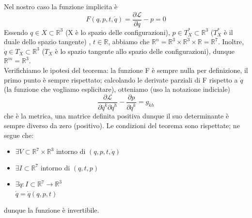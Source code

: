 \documentclass[
10pt, %
a4paper, %
oneside, %
headinclude,footinclude, %
BCOR5mm, %
]{scrartcl}
\begin{document}
\begin{dimostrazione}
Nel nostro caso la funzione implicita è
\[F(q, p, t, \dot{q}) = \frac{\partial \mathcal{L}}{\partial \dot{q}}-p=0\]
Essendo \(q\in X\subset\mathbb{R}^3\) (X è lo spazio delle configurazioni), \(p\in T^*_X\subset\mathbb{R}^3 \) (\( T^*_X\) è il duale dello spazio tangente) , \(t\in \mathbb{R}\), abbiamo che \(\mathbb{R}^n = \mathbb{R}^3\times\mathbb{R}^3\times \mathbb{R} = \mathbb{R}^7\). Inoltre, \(\dot{q}\in T_X\subset\mathbb{R}^3\) (\(T_X\) è lo spazio tangente allo spazio delle configurazioni), dunque \(\mathbb{R}^m = \mathbb{R}^3\).\\
Verifichiamo le ipotesi del teorema: la funzione F è sempre nulla per definizione, il primo punto è sempre rispettato; calcolando le derivate parziali di F rispetto a $\dot{q}$ (la funzione che vogliamo esplicitare), otteniamo (uso la notazione indiciale)
\[\frac{\partial \mathcal{L}}{\partial \dot{q}^k\partial \dot{q}^h}- \frac{\partial p}{\partial \dot{q}^k} = g_{kh}\]
che è la metrica, una matrice definita positiva dunque il suo determinante è sempre diverso da zero (positivo). Le condizioni del teorema sono rispettate; ne segue che:
\begin{itemize}
	\item
	\(\exists V \subset \mathbb{R}^7\times \mathbb{R}^3\)
	intorno di \((q, p, t, \dot{q})\)
	\item  \(\exists I \subset \mathbb{R}^7\)
	intorno di \((q, t, p)\)
	\item \(\exists \dot{q}:I\subset\mathbb{R}^7\rightarrow \mathbb{R}^3\)\\
	\(\dot{q} = \dot{q}(q, p, t) \)
\end{itemize}
dunque la funzione è invertibile.
\end{dimostrazione}
\end{document}
